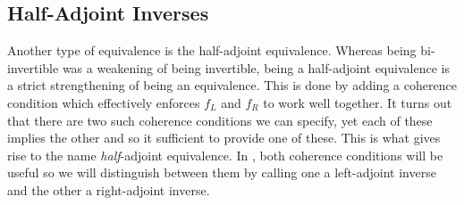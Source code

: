 \documentclass{article}
\theoremstyle{definition}
\theoremstyle{remark}
\begin{document}
\subsection{Half-Adjoint Inverses}\label{sec:hai}

Another type of equivalence is the half-adjoint equivalence. Whereas being bi-invertible was a weakening of being invertible, being a half-adjoint equivalence is a strict strengthening of being an equivalence. This is done by adding a coherence condition which effectively enforces \(f_L\) and \(f_R\) to work well together. It turns out that there are two such coherence conditions we can specify, yet each of these implies the other and so it sufficient to provide one of these. This is what gives rise to the name \emph{half}-adjoint equivalence. In , both coherence conditions will be useful so we will distinguish between them by calling one a left-adjoint inverse and the other a right-adjoint inverse.
\end{document}
